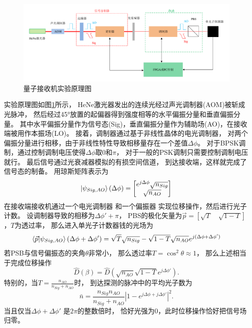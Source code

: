 \begin{figure}
\centering
  \includegraphics[width=\textwidth]{figures/chap5/experiment-schematic}
  \caption{量子接收机实验原理图}
  \label{fig:experiment-schematic}
\end{figure}



实验原理图如图\ref{fig:experiment-schematic}所示，
HeNe激光器发出的连续光经过声光调制器(AOM)被斩成光脉冲，
然后经过45°放置的起偏器得到强度相等的水平偏振分量和垂直偏振分量。
其中水平偏振分量作为信号态(Sig)，垂直偏振分量作为辅助场(AO)，在接收端被用作本振场(LO)。
接着，调制器通过基于非线性晶体的电光调制器，
对两个偏振分量进行相移，由于非线性特性导致相移量存在一个差值$\Delta \phi$。
对于BPSK调制，通过控制调制电压使得$\Delta \phi$取$0$和$\pi$，
对于一般的PSK调制只需要控制调制电压就行。
最后信号通过光衰减器模拟的有损空间信道，
到达接收端，这样就完成了信号态的制备。
用琼斯矩阵表示为
\begin{equation}
\ket{\psi_{Sig, AO}}(\Delta \phi) = \begin{bmatrix}
                            e^{j \Delta \phi}\sqrt{n_{Sig}} \\
                            \sqrt{n_{AO}} 
                        \end{bmatrix}
\end{equation}
在接收端接收机通过一个电光调制器
和一个偏振器
实现位移操作，然后进行光子计数。
设调制器导致的相移为$\Delta \phi' + \pi$，
PBS的极化矢量为$\vec{p} = [\sqrt{T} \quad \sqrt{1-T}]$，$T$为透过率，
那么进入单光子计数器钱的光场为
\begin{equation}
\bra{\vec{p}} \ket{\psi_{Sig, AO}}(\Delta \phi + \Delta \phi') \\
             =  \sqrt{T}\sqrt{n_{Sig}} - \sqrt{1-T}\sqrt{n_{AO}} e^{j(\Delta \phi + \Delta \phi')} 
\end{equation}
若PSB与信号偏振态的夹角$\theta$非常小，
那么透过率$T = \cos^2 \theta \approx 1$，
那么上述相当于完成位移操作
\begin{equation}
\hat{D}(\beta) = \hat{D}(\sqrt{n_{AO}}\sqrt{1-T} e^{j \Delta\phi'}).
\end{equation}
特别的，当$T = \frac{n_{AO}}{n_{Sig} + n_{AO}}$时，
到达探测的脉冲中的平均光子数为
\begin{equation}
\bar{n} = \frac{n_{Sig} n_{AO}}{n_{Sig} + n_{AO}} \left|1 - e^{j\Delta \phi + j \Delta \phi'} \right|^2.
\end{equation}
当且仅当$\Delta \phi + \Delta \phi'$ 是$2\pi$的整数倍时，
恰好光强为0，此时位移操作恰好把信号场归零。

